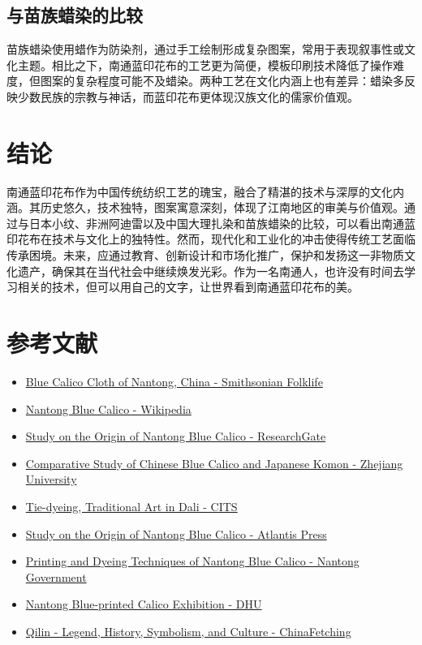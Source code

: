 \documentclass[12pt]{article}
\begin{document}
\subsection{与苗族蜡染的比较}
苗族蜡染使用蜡作为防染剂，通过手工绘制形成复杂图案，常用于表现叙事性或文化主题。相比之下，南通蓝印花布的工艺更为简便，模板印刷技术降低了操作难度，但图案的复杂程度可能不及蜡染。两种工艺在文化内涵上也有差异：蜡染多反映少数民族的宗教与神话，而蓝印花布更体现汉族文化的儒家价值观。

\section{结论}
南通蓝印花布作为中国传统纺织工艺的瑰宝，融合了精湛的技术与深厚的文化内涵。其历史悠久，技术独特，图案寓意深刻，体现了江南地区的审美与价值观。通过与日本小纹、非洲阿迪雷以及中国大理扎染和苗族蜡染的比较，可以看出南通蓝印花布在技术与文化上的独特性。然而，现代化和工业化的冲击使得传统工艺面临传承困境。未来，应通过教育、创新设计和市场化推广，保护和发扬这一非物质文化遗产，确保其在当代社会中继续焕发光彩。作为一名南通人，也许没有时间去学习相关的技术，但可以用自己的文字，让世界看到南通蓝印花布的美。

\section{参考文献}
\begin{itemize}
    \item \href{https://folklife.si.edu/magazine/blue-calico-cloth-nantong-china}{Blue Calico Cloth of Nantong, China - Smithsonian Folklife}
    \item \href{https://en.wikipedia.org/wiki/Nantong_blue_calico}{Nantong Blue Calico - Wikipedia}
    \item \href{https://www.researchgate.net/publication/315870915_Study_on_the_Origin_of_Nantong_Blue_Calico}{Study on the Origin of Nantong Blue Calico - ResearchGate}
    \item \href{https://www.zjujournals.com/soc/EN/abstract/abstract133522.shtml}{Comparative Study of Chinese Blue Calico and Japanese Komon - Zhejiang University}
    \item \href{http://www.zhangjiajieholiday.com/show-366-2391-1.html}{Tie-dyeing, Traditional Art in Dali - CITS}
    \item \href{https://www.atlantis-press.com/proceedings/hss-17/25873402}{Study on the Origin of Nantong Blue Calico - Atlantis Press}
    \item \href{http://en.nantong.gov.cn/2018-08/07/c_260693.htm}{Printing and Dyeing Techniques of Nantong Blue Calico - Nantong Government}
    \item \href{https://english.dhu.edu.cn/2025/0224/c5357a359118/page.htm}{Nantong Blue-printed Calico Exhibition - DHU}
    \item \href{https://www.chinafetching.com/qilin}{Qilin - Legend, History, Symbolism, and Culture - ChinaFetching}
\end{itemize}
\end{document}
